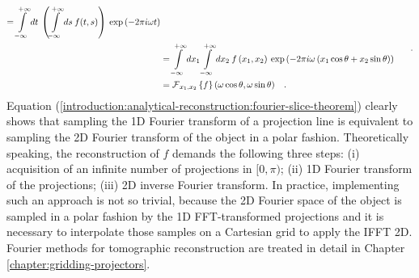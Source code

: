 {\begin{equation}
\begin{split}
             = \int\limits_{-\infty}^{+\infty}dt\:\left( \int\limits_{-\infty}^{+\infty}ds\:f(t,s) \right)\:\exp\left(-2\pi i\omega t\right)\\  
                                                                         &=
             \int\limits_{-\infty}^{+\infty}dx_{1}\int\limits_{-\infty}^{+\infty}dx_{2}\:f\left(x_{1},x_{2}\right)
                          \:\exp\left(-2\pi i\omega\left(x_{1}\cos\theta + x_{2}\sin\theta\right)\right) \\
                                                                         &=
                          \operatorname{\mathcal{F}}_{x_{1},x_{2}}\left\{ f \right\}\left(\omega\cos\theta,\omega\sin\theta\right)\hspace{0.3cm}.
    \end{split} \hspace{0.3cm}.
\end{equation}
Equation (\ref{introduction:analytical-reconstruction:fourier-slice-theorem}) clearly shows that sampling the 1D Fourier
transform of a projection line is equivalent to sampling the 2D Fourier transform of the object
in a polar fashion. Theoretically speaking, the reconstruction of $f$ demands the following three steps: (i) acquisition of
an infinite number of projections in $[0,\pi)$; (ii)
1D Fourier transform of the projections; (iii) 2D inverse Fourier transform.
In practice, implementing such an approach is not so trivial, because the 2D Fourier space of the object is sampled
in a polar fashion by the 1D FFT-transformed projections and it is necessary to interpolate those samples on a Cartesian grid
to apply the IFFT 2D. Fourier methods for tomographic reconstruction are treated in detail in Chapter \ref{chapter:gridding-projectors}.
%
%
%
}
